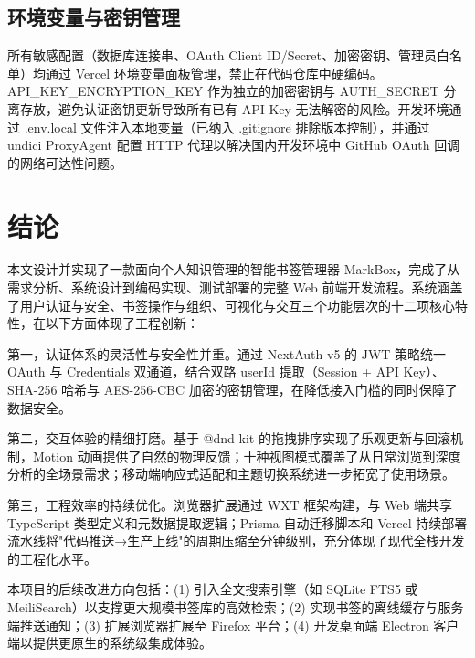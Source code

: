 \documentclass[a4paper,12pt]{ctexart}
\begin{document}
\subsection{环境变量与密钥管理}

所有敏感配置（数据库连接串、OAuth Client ID/Secret、加密密钥、管理员白名单）均通过 Vercel 环境变量面板管理，禁止在代码仓库中硬编码。API\_KEY\_ENCRYPTION\_KEY 作为独立的加密密钥与 AUTH\_SECRET 分离存放，避免认证密钥更新导致所有已有 API Key 无法解密的风险。开发环境通过 .env.local 文件注入本地变量（已纳入 .gitignore 排除版本控制），并通过 undici ProxyAgent 配置 HTTP 代理以解决国内开发环境中 GitHub OAuth 回调的网络可达性问题。


\section{结论}

本文设计并实现了一款面向个人知识管理的智能书签管理器 MarkBox，完成了从需求分析、系统设计到编码实现、测试部署的完整 Web 前端开发流程。系统涵盖了用户认证与安全、书签操作与组织、可视化与交互三个功能层次的十二项核心特性，在以下方面体现了工程创新：

第一，认证体系的灵活性与安全性并重。通过 NextAuth v5 的 JWT 策略统一 OAuth 与 Credentials 双通道，结合双路 userId 提取（Session + API Key）、SHA-256 哈希与 AES-256-CBC 加密的密钥管理，在降低接入门槛的同时保障了数据安全。

第二，交互体验的精细打磨。基于 @dnd-kit 的拖拽排序实现了乐观更新与回滚机制，Motion 动画提供了自然的物理反馈；十种视图模式覆盖了从日常浏览到深度分析的全场景需求；移动端响应式适配和主题切换系统进一步拓宽了使用场景。

第三，工程效率的持续优化。浏览器扩展通过 WXT 框架构建，与 Web 端共享 TypeScript 类型定义和元数据提取逻辑；Prisma 自动迁移脚本和 Vercel 持续部署流水线将"代码推送→生产上线"的周期压缩至分钟级别，充分体现了现代全栈开发的工程化水平。

本项目的后续改进方向包括：(1) 引入全文搜索引擎（如 SQLite FTS5 或 MeiliSearch）以支撑更大规模书签库的高效检索；(2) 实现书签的离线缓存与服务端推送通知；(3) 扩展浏览器扩展至 Firefox 平台；(4) 开发桌面端 Electron 客户端以提供更原生的系统级集成体验。

\end{document}
